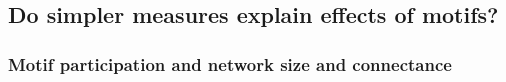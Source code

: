 \documentclass[12pt]{article}
\begin{document}
\begin{spacing}{2.0}
    
    \clearpage
    
    \subsection*{Do simpler measures explain effects of motifs?}

        \subsubsection*{Motif participation and network size and connectance}
        

\end{spacing}
\end{document}

